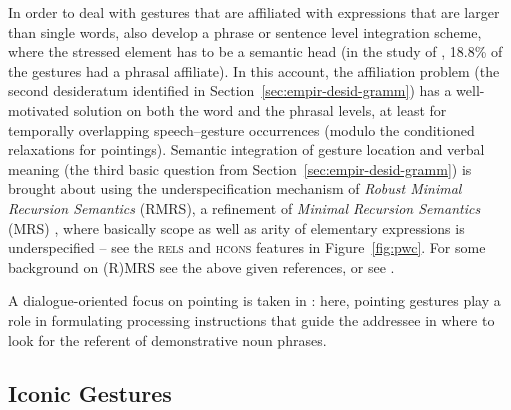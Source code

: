 \documentclass[output=paper
 	        ,biblatex
                ,babelshorthands
                ,newtxmath
                ,draftmode
                ,colorlinks, citecolor=brown
]{langscibook}
\begin{document}
In order to deal with gestures that are affiliated with expressions that are larger than single words, \citet{Alahverdzhieva:Lascarides:Flickinger:2017} also develop a phrase or sentence level integration scheme, where the stressed element has to be a semantic head (in the study of \citealt{Mehler:Luecking:2012:d}, 18.8\% of the gestures had a phrasal affiliate).
%
In this account, the affiliation problem (the second desideratum identified in Section~\ref{sec:empir-desid-gramm}) has a well-motivated solution on both the word and the phrasal levels, at least for temporally overlapping speech--gesture occurrences (modulo the conditioned relaxations for pointings).
%
Semantic integration of gesture location and verbal meaning (the third basic question from Section~\ref{sec:empir-desid-gramm}) is brought about using the underspecification mechanism of \emph{Robust Minimal Recursion Semantics} (RMRS), a refinement of \emph{Minimal Recursion Semantics} (MRS) \citep{Copestake:Flickinger:Pollard:Sag:2005}, where basically scope as well as arity of elementary expressions is underspecified \citep{Copestake:2007} -- see the \textsc{rels} and \textsc{hcons} features in Figure~\ref{fig:pwc}.
%
For some background on (R)MRS see the above given references, or see . %


A dialogue-oriented focus on pointing is taken in \citet{Luecking:2018:a}: here, pointing gestures play a role in formulating processing instructions that guide the addressee in where to look for the referent of demonstrative noun phrases. %



\subsection{Iconic Gestures}
\label{sec:iconic-gestures}
\end{document}
